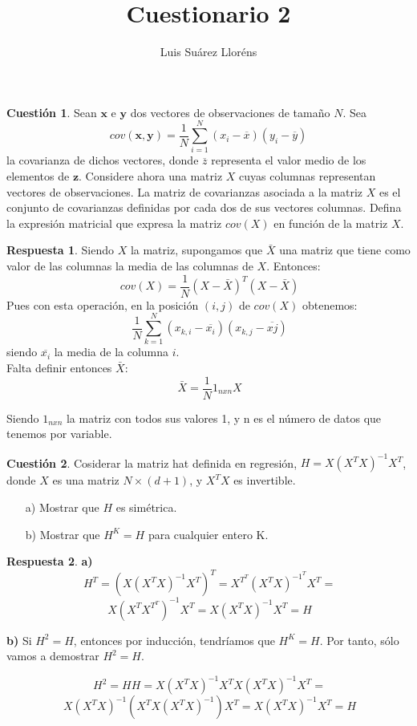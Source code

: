 \documentclass[10pt,a4paper]{article}
\author{Luis Suárez Lloréns}
\title{Cuestionario 2}
\date{}
\theoremstyle{definition}
\newtheorem{cuestion}{Cuestión}
\newtheorem*{respuesta}{Respuesta}
\begin{document}
\maketitle

\begin{cuestion}
Sean $\mathbf{x}$ e $\mathbf{y}$ dos vectores de observaciones de tamaño $N$. Sea
\[
	cov(\mathbf{x},\mathbf{y})=\frac{1}{N}\sum_{i=1}^N(x_i-\overline{x})(y_i - \overline{y})
\]
la covarianza de dichos vectores, donde $\overline{z}$ representa el valor medio de los elementos de $\mathbf{z}$. Considere ahora una matriz $X$ cuyas columnas representan vectores de observaciones. La matriz de covarianzas asociada a la matriz $X$ es el conjunto de covarianzas definidas por cada dos de sus vectores columnas. Defina la expresión matricial que expresa la matriz $cov(X)$ en función de la matriz $X$.
\end{cuestion}
\begin{respuesta}
Siendo $X$ la matriz, supongamos que $\bar{X}$ una matriz que tiene como valor de las columnas la media de las columnas de $X$. Entonces:\\
\[
\ cov(X) = \frac{1}{N} \left(X-\bar{X}\right)^T\left(X-\bar{X}\right)
\]
Pues con esta operación, en la posición $(i,j)$ de $cov(X)$ obtenemos:
\[
\ \frac{1}{N}\sum_{k=1}^N(x_{k,i}-\overline{x_i})(x_{k,j} - \overline{x{j}})
\]
siendo $\overline{x_i}$ la media de la columna $i$.\\

Falta definir entonces $\bar{X}$:
\[
\ \bar{X} = \frac{1}{N} 1_{nxn}X
\]

Siendo $1_{nxn}$ la matriz con todos sus valores 1, y n es el número de datos que tenemos por variable.
\end{respuesta}

\begin{cuestion}
Cosiderar la matriz hat definida en regresión, $H=X(X^TX)^{-1}X^T$, donde $X$ es una matriz $N \times (d+1)$, y $X^TX$ es invertible.
\begin{enumerate}
\item[a)] Mostrar que $H$ es simétrica.
\item[b)] Mostrar que $H^K=H$ para cualquier entero K.
\end{enumerate}
\end{cuestion}
\begin{respuesta}
\textbf{a)}
\[
\ H^T = \left(X\left(X^TX\right)^{-1}X^T\right)^T = X^{T^T}\left(X^TX\right)^{-1^T}X^T = 
\]
\[
\ X\left(X^TX^{T^T}\right)^{-1}X^T = X(X^TX)^{-1}X^T = H
\]

\textbf{b)}
Si $H^2 = H$, entonces por inducción, tendríamos que $H^K=H$. Por tanto, sólo vamos a demostrar $H^2 = H$.

\[
\ H^2 = HH= X(X^TX)^{-1}X^TX(X^TX)^{-1}X^T = 
\] 
\[
\ X(X^TX)^{-1}\left(X^TX(X^TX)^{-1}\right)X^T = X(X^TX)^{-1}X^T = H
\]
\end{respuesta}
\end{document}
